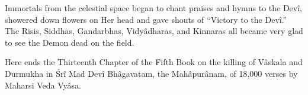 Immortals from the celestial space began to chant praises and hymns to the Dev\^i, showered down flowers on Her head and gave shouts of ``Victory to the Dev\^i.'' The Risis, Siddhas, Gandarbhas, Vidy\^adharas, and Kinnaras all became very glad to see the Demon dead on the field.

Here ends the Thirteenth Chapter of the Fifth Book on the killing of V\^askala and Durmukha in \'Sr\^i Mad Dev\^i Bh\^agavatam, the Mah\^apur\^anam, of 18,000 verses by Maharsi Veda Vy\^asa.